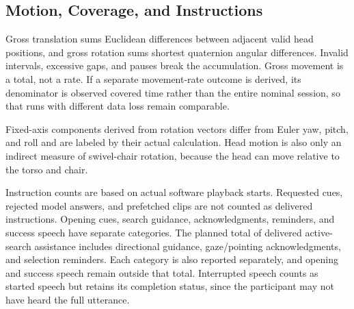\subsection{Motion, Coverage, and Instructions}
Gross translation sums Euclidean differences between adjacent valid head positions, and gross rotation sums shortest quaternion angular differences. Invalid intervals, excessive gaps, and pauses break the accumulation. Gross movement is a total, not a rate. If a separate movement-rate outcome is derived, its denominator is observed covered time rather than the entire nominal session, so that runs with different data loss remain comparable.

Fixed-axis components derived from rotation vectors differ from Euler yaw, pitch, and roll and are labeled by their actual calculation. Head motion is also only an indirect measure of swivel-chair rotation, because the head can move relative to the torso and chair.

Instruction counts are based on actual software playback starts. Requested cues, rejected model answers, and prefetched clips are not counted as delivered instructions. Opening cues, search guidance, acknowledgments, reminders, and success speech have separate categories. The planned total of delivered active-search assistance includes directional guidance, gaze/pointing acknowledgments, and selection reminders. Each category is also reported separately, and opening and success speech remain outside that total. Interrupted speech counts as started speech but retains its completion status, since the participant may not have heard the full utterance.

